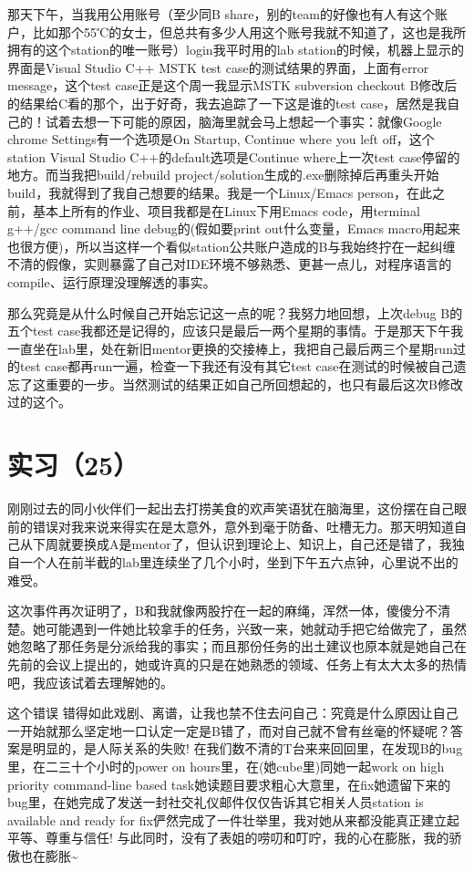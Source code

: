 \documentclass[12pt]{book}
\begin{document}
那天下午，当我用公用账号（至少同B share，别的team的好像也有人有这个账户，比如那个55℃的女士，但总共有多少人用这个账号我就不知道了，这也是我所拥有的这个station的唯一账号）login我平时用的lab station的时候，机器上显示的界面是Visual Studio C++ MSTK test case的测试结果的界面，上面有error message，这个test case正是这个周一我显示MSTK subversion checkout B修改后的结果给C看的那个，出于好奇，我去追踪了一下这是谁的test case，居然是我自己的！试着去想一下可能的原因，脑海里就会马上想起一个事实：就像Google chrome Settings有一个选项是On Startup,  Continue where you left off，这个station Visual Studio C++的default选项是Continue where上一次test case停留的地方。而当我把build/rebuild project/solution生成的.exe删除掉后再重头开始build，我就得到了我自己想要的结果。我是一个Linux/Emacs person，在此之前，基本上所有的作业、项目我都是在Linux下用Emacs code，用terminal g++/gcc command line debug的(假如要print out什么变量，Emacs macro用起来也很方便)，所以当这样一个看似station公共账户造成的B与我始终拧在一起纠缠不清的假像，实则暴露了自己对IDE环境不够熟悉、更甚一点儿，对程序语言的compile、运行原理没理解透的事实。

那么究竟是从什么时候自己开始忘记这一点的呢？我努力地回想，上次debug B的五个test case我都还是记得的，应该只是最后一两个星期的事情。于是那天下午我一直坐在lab里，处在新旧mentor更换的交接棒上，我把自己最后两三个星期run过的test case都再run一遍，检查一下我还有没有其它test case在测试的时候被自己遗忘了这重要的一步。当然测试的结果正如自己所回想起的，也只有最后这次B修改过的这个。

\section{实习（25）}
\label{sec-5-28}

刚刚过去的同小伙伴们一起出去打捞美食的欢声笑语犹在脑海里，这份摆在自己眼前的错误对我来说来得实在是太意外，意外到毫于防备、吐槽无力。那天明知道自己从下周就要换成A是mentor了，但认识到理论上、知识上，自己还是错了，我独自一个人在前半截的lab里连续坐了几个小时，坐到下午五六点钟，心里说不出的难受。

这次事件再次证明了，B和我就像两股拧在一起的麻绳，浑然一体，傻傻分不清楚。她可能遇到一件她比较拿手的任务，兴致一来，她就动手把它给做完了，虽然她忽略了那任务是分派给我的事实；而且那份任务的出土建议也原本就是她自己在先前的会议上提出的，她或许真的只是在她熟悉的领域、任务上有太大太多的热情吧，我应该试着去理解她的。

这个错误 错得如此戏剧、离谱，让我也禁不住去问自己：究竟是什么原因让自己一开始就那么坚定地一口认定一定是B错了，而对自己就不曾有丝毫的怀疑呢？答案是明显的，是人际关系的失败! 在我们数不清的T台来来回回里，在发现B的bug里，在二三十个小时的power on hours里，在(她cube里)同她一起work on  high priority command-line based task她读题目要求粗心大意里，在fix她遗留下来的bug里，在她完成了发送一封社交礼仪邮件仅仅告诉其它相关人员station is available and ready for fix俨然完成了一件壮举里，我对她从来都没能真正建立起平等、尊重与信任! 与此同时，没有了表姐的唠叨和叮咛，我的心在膨胀，我的骄傲也在膨胀\textasciitilde{}~
\end{document}
